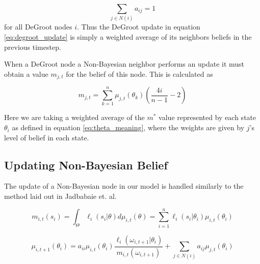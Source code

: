 \documentclass[a4paper,12pt]{article}
\begin{document}
\begin{equation}
\nonumber
\sum_{j \in N(i)} a_{ij} = 1
\end{equation}
for all DeGroot nodes $i$.  Thus the DeGroot update in equation \ref{eq:degroot_update} is simply a weighted average of its neighbors beliefs in the previous timestep.

When a DeGroot node a Non-Bayesian neighbor performs an update it must obtain a value 
$m_{j,t}$ for the belief of this node.  This is calculated as

\begin{equation}
m_{j,t} = \sum_{k=1}^n\mu_{j,t}(\theta_k)(\frac{4i}{n - 1} - 2)
\end{equation}

Here we are taking a weighted average of the $m^*$ value represented by each state $\theta_i$ as defined in equation \ref{eq:theta_meaning}, where the weights are given by $j$'s level of belief in each state.

\subsection{Updating Non-Bayesian Belief}

The update of a Non-Bayesian node in our model is handled similarly to the method laid out 
in Jadbabaie et. al. %


\begin{equation}
m_{i,t}(s_i) = \int_\Theta \ell_i(s_i|\theta)d\mu_{i,t}(\theta) = \sum_{i=1}^n \ell_i(s_i|\theta_i)\mu_{i,t}(\theta_i)
\end{equation}

\begin{equation}
\mu_{i,t+1}(\theta_i) = a_{ii}\mu_{i,t}(\theta_i)\frac{\ell_i(\omega_{i,t+1}|\theta_i)}{m_{i,t}(\omega_{i,t+1})} + \sum_{j \in N(i)} a_{ij}\mu_{j,t}(\theta_i)
\end{equation}
\end{document}
